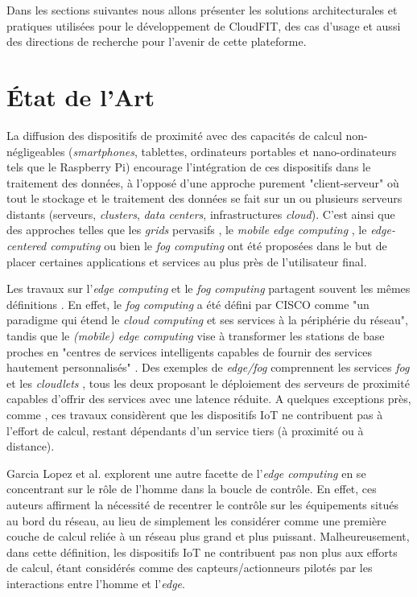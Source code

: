 Dans les sections suivantes nous allons présenter les solutions architecturales et pratiques utilisées pour le développement de CloudFIT, des cas d'usage et aussi des directions de recherche pour l'avenir de cette plateforme.

\section{État de l'Art}

La diffusion des dispositifs de proximité avec des capacités de calcul non-négligeables (\textit{smartphones}, tablettes, ordinateurs portables et nano-ordinateurs tels que le Raspberry Pi) encourage l'intégration de ces dispositifs dans le traitement des données, à l'opposé d'une approche purement "client-serveur" où tout le stockage et le traitement des données se fait sur un ou plusieurs serveurs distants (serveurs, \textit{clusters}, \textit{data centers}, infrastructures \textit{cloud}). C'est ainsi que des approches telles que les \textit{grids} pervasifs \cite{Parashar2010}, le \textit{mobile edge computing} \cite {Dey2013,MEC,Satyanarayanan09}, le \textit{edge-centered computing} \cite{Lopez2015} ou bien le \textit{fog computing} \cite{Bonomi2012} ont été proposées dans le but de placer certaines applications et services au plus près de l'utilisateur final.

Les travaux sur l'\textit{edge computing} et le \textit{fog computing} partagent souvent les mêmes définitions \cite{Vermesan}. En effet, le \textit{fog computing} a été défini par CISCO \cite{FogCISCO} comme "un paradigme qui étend le \textit{cloud computing} et ses services à la périphérie du réseau", tandis que le \textit{(mobile) edge computing} vise à transformer les stations de base proches en "centres de services intelligents capables de fournir des services hautement personnalisés" \cite{Vermesan}. Des exemples de \textit{edge/fog} comprennent les services \textit{fog} \cite{Bonomi2012} et les \textit{cloudlets} \cite{Satyanarayanan09}, tous les deux proposant le déploiement des serveurs de proximité capables d'offrir des services avec une latence réduite. A quelques exceptions près, comme \cite{Dey2013}, ces travaux considèrent que les dispositifs IoT ne contribuent pas à l'effort de calcul, restant dépendants d'un service tiers (à proximité ou à distance).

Garcia Lopez et al. \cite{Lopez2015} explorent une autre facette de l'\textit{edge computing} en se concentrant sur le rôle de l'homme dans la boucle de contrôle. En effet, ces auteurs affirment la nécessité de recentrer le contrôle sur les équipements situés au bord du réseau, au lieu de simplement les considérer comme une première couche de calcul reliée à un réseau plus grand et plus puissant. %
Malheureusement, dans cette définition, les dispositifs IoT ne contribuent pas non plus aux efforts de calcul, étant considérés comme des capteurs/actionneurs pilotés par les interactions entre l'homme et l'\textit{edge}.

